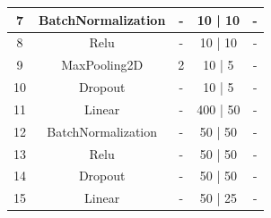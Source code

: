 \documentclass[12pt, spanish]{article}
\begin{document}
\begin{table}[H]
{\begin{tabular}{|c|c|c|c|c|}
7                       & BatchNormalization    & -                                                                                    & 10 | 10                           & -                                                                                                 \\ \hline
8                       & Relu                  & -                                                                                    & 10 | 10                           & -                                                                                                 \\ \hline
9                       & MaxPooling2D          & 2                                                                                    & 10 | 5                            & -                                                                                                 \\ \hline
10                      & Dropout               & -                                                                                    & 10 | 5                            & -                                                                                                 \\ \hline
11                      & Linear                & -                                                                                    & 400 | 50                          & -                                                                                                 \\ \hline
12                      & BatchNormalization    & -                                                                                    & 50 | 50                           & -                                                                                                 \\ \hline
13                      & Relu                  & -                                                                                    & 50 | 50                           & -                                                                                                 \\ \hline
14                      & Dropout               & -                                                                                    & 50 | 50                           & -                                                                                                 \\ \hline
15                      & Linear                & -                                                                                    & 50 | 25                           & -                                                                                                 \\ \hline

\end{tabular}}
\end{table}
\end{document}
